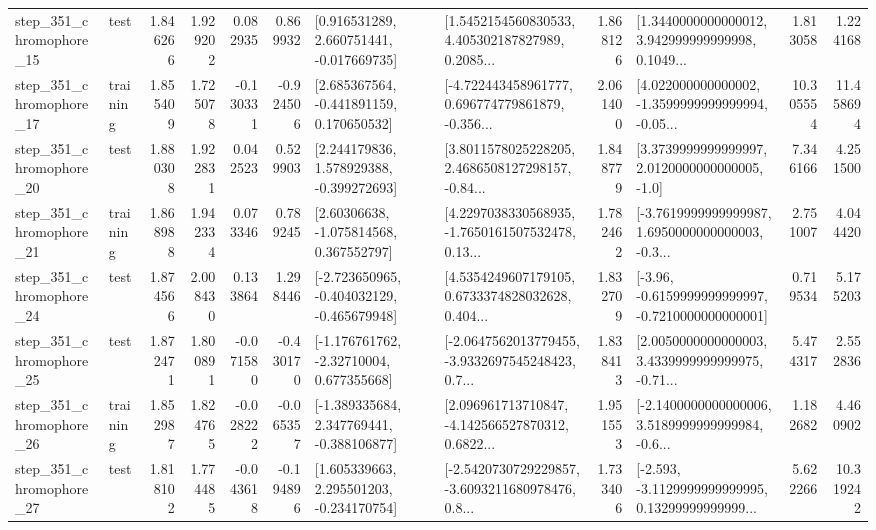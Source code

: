 \begin{tabular}{llrrrrllrlrr}
  step\_351\_chromophore\_15 &      test &      1.846266 &    1.929202 &      0.082935 &  0.869932 &    [0.916531289, 2.660751441, -0.017669735] &  [1.5452154560830533, 4.405302187827989, 0.2085... &       1.868126 &  [1.3440000000000012, 3.942999999999998, 0.1049... &            1.813058 &          1.224168 \\
  step\_351\_chromophore\_17 &  training &      1.855409 &    1.725078 &     -0.130331 & -0.924506 &    [2.685367564, -0.441891159, 0.170650532] &  [-4.722443458961777, 0.696774779861879, -0.356... &       2.061400 &  [4.022000000000002, -1.3599999999999994, -0.05... &           10.305554 &         11.458694 \\
  step\_351\_chromophore\_20 &      test &      1.880308 &    1.922831 &      0.042523 &  0.529903 &    [2.244179836, 1.578929388, -0.399272693] &  [3.8011578025228205, 2.4686508127298157, -0.84... &       1.848779 &     [3.3739999999999997, 2.0120000000000005, -1.0] &            7.346166 &          4.251500 \\
  step\_351\_chromophore\_21 &  training &      1.868988 &    1.942334 &      0.073346 &  0.789245 &     [2.60306638, -1.075814568, 0.367552797] &  [4.2297038330568935, -1.7650161507532478, 0.13... &       1.782462 &  [-3.7619999999999987, 1.6950000000000003, -0.3... &            2.751007 &          4.044420 \\
  step\_351\_chromophore\_24 &      test &      1.874566 &    2.008430 &      0.133864 &  1.298446 &  [-2.723650965, -0.404032129, -0.465679948] &  [4.5354249607179105, 0.6733374828032628, 0.404... &       1.832709 &  [-3.96, -0.6159999999999997, -0.7210000000000001] &            0.719534 &          5.175203 \\
  step\_351\_chromophore\_25 &      test &      1.872471 &    1.800891 &     -0.071580 & -0.430170 &    [-1.176761762, -2.32710004, 0.677355668] &  [-2.0647562013779455, -3.9332697545248423, 0.7... &       1.838413 &  [2.0050000000000003, 3.4339999999999975, -0.71... &            5.474317 &          2.552836 \\
  step\_351\_chromophore\_26 &  training &      1.852987 &    1.824765 &     -0.028222 & -0.065357 &   [-1.389335684, 2.347769441, -0.388106877] &  [2.096961713710847, -4.142566527870312, 0.6822... &       1.951553 &  [-2.1400000000000006, 3.5189999999999984, -0.6... &            1.182682 &          4.460902 \\
  step\_351\_chromophore\_27 &      test &      1.818102 &    1.774485 &     -0.043618 & -0.194896 &    [1.605339663, 2.295501203, -0.234170754] &  [-2.5420730729229857, -3.6093211680978476, 0.8... &       1.733406 &  [-2.593, -3.1129999999999995, 0.13299999999999... &            5.622266 &         10.319242 \\

\end{tabular}
